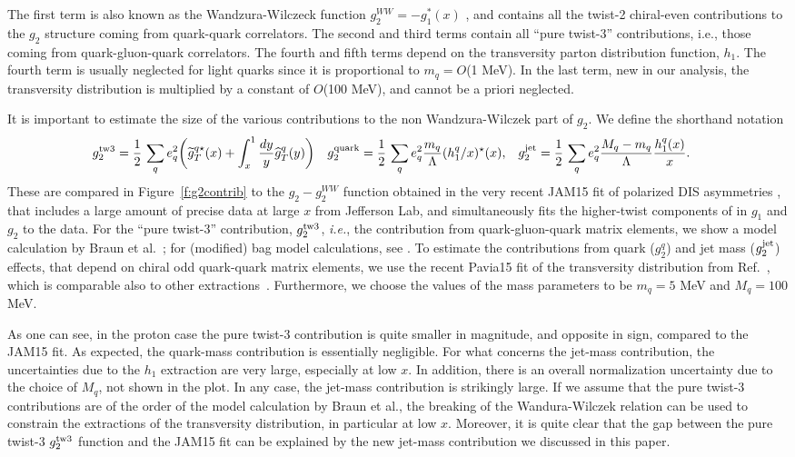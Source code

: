 \documentclass[preprintnumbers,floatfix,nofootinbib]{revtex4}
\newcommand{\mj}{M_q}
\newcommand{\mq}{m_q}
\begin{document}
The first term is also known as the Wandzura-Wilczeck function $g_2^{WW} =
-g_1^*(x)$ , and contains all the twist-2 chiral-even contributions to
the $g_2$ structure coming from quark-quark correlators. The second and third
terms contain all ``pure twist-3'' contributions, i.e., those coming from
quark-gluon-quark correlators. The fourth and fifth terms depend on the
transversity parton distribution function, $h_1$. 
The fourth term is usually neglected for
light quarks since it is proportional to $\mq=O$(1 MeV). In the last term,
new in our analysis, the transversity distribution is multiplied by a constant
of $O$(100 MeV), and cannot be a priori neglected.

It is important to estimate the size of the various contributions to the non Wandzura-Wilczek part of $g_2$. We define the shorthand notation
\begin{align}
g_2^{\rm tw3} & = \frac{1}{2}\,\sum_q e_q^2
    \biggl(
    \widetilde g_T^{q \star}(x) 
    + \int_x^1\frac{dy}{y} \widehat{g}_T^q(y) 
    \biggr) 
&
g_2^{\text{quark}} &= \frac{1}{2}\,\sum_q e_q^2 
 \frac{\mq}{\Lambda} (h_1^q/x)^\star(x),
&
g_2^{\text{jet}} &= \frac{1}{2}\,\sum_q e_q^2 
\frac{\mj-\mq}{\Lambda} \frac{h_1^q(x)}{x}. 
\end{align} 
These are compared in Figure~\ref{f:g2contrib} to the $g_2-g_2^{WW}$ function
obtained in the very recent JAM15 fit of polarized DIS asymmetries
\cite{Sato:2016tuz}, that includes a large amount of precise data at large $x$
from Jefferson Lab, and simultaneously fits the higher-twist components of in
$g_1$ and $g_2$ to the data. For the ``pure twist-3'' contribution,
$g_2^{\rm tw3}$, {\it i.e.}, the contribution from quark-gluon-quark matrix
elements, we show a model calculation by Braun et al.~\cite{Braun:2011aw}; for
(modified) bag model calculations, see \cite{Jaffe:1990qh,Stratmann:1993aw}. To estimate the contributions
from quark ($g_2^q$) and jet mass ($g_2^{\rm jet}$) effects, that depend on chiral
odd quark-quark matrix elements, we use the recent Pavia15 fit of the
transversity distribution from Ref.~\cite{Radici:2015mwa}, which is comparable
also to other 
extractions~\cite{Anselmino:2013vqa,Kang:2015msa}. Furthermore, we choose the
values of the mass parameters to be $\mq=5$ MeV and $\mj = 100$ MeV. 

As one can see, in the proton case the pure twist-3 contribution is quite
smaller in magnitude, and opposite in sign, compared to the JAM15 fit. As
expected, the quark-mass contribution is essentially negligible. 
For what concerns the jet-mass contribution, the uncertainties due to the $h_1$
extraction are very large, especially at low $x$. In addition, there is an
overall normalization uncertainty due to the choice of $\mj$, not shown in the
plot. In any case, the jet-mass contribution is strikingly large. If we assume
that the pure twist-3 contributions are of the order of the model calculation
by Braun et al., the breaking of the Wandura-Wilczek relation can be used to
constrain the extractions of the transversity distribution, in particular at
low $x$. 
Moreover, it is quite clear that the gap
between the pure twist-3 $g_2^{\rm tw3}$ function and the JAM15 fit can be
explained by the new jet-mass contribution we discussed in this paper.  
\end{document}
